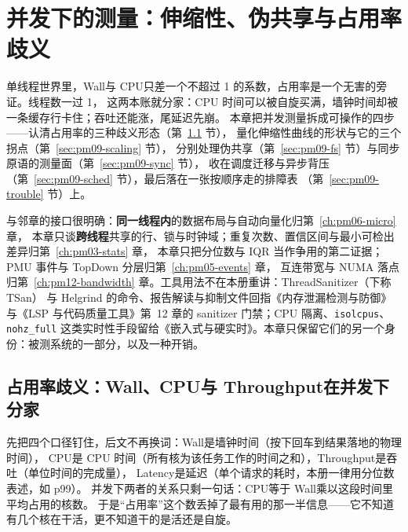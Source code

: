 \documentclass[12pt,a4paper,fontset=fandol]{ctexbook}
\newcommand{\Tp}[1]{\texttt{#1}}
\newcommand{\Lang}[1]{\textsf{#1}}
\newcommand{\MWall}{\Lang{Wall}}
\newcommand{\MCpu}{\Lang{CPU}}
\newcommand{\MLat}{\Lang{Latency}}
\newcommand{\MThr}{\Lang{Throughput}}
\newcommand{\Mx}[1]{\textsf{#1}}
\begin{document}
\chapter{并发下的测量：伸缩性、伪共享与占用率歧义}
\label{ch:pm09-concurrency}

单线程世界里，\MWall 与 \MCpu 只差一个不超过 1 的系数，占用率是一个无害的旁证。线程数一过 1，
这两本账就分家：CPU 时间可以被自旋买满，墙钟时间却被一条缓存行卡住；吞吐还能涨，尾延迟先崩。
本章把并发测量拆成可操作的四步——认清占用率的三种歧义形态（第~\ref{sec:pm09-ambiguity} 节），
量化伸缩性曲线的形状与它的三个拐点（第~\ref{sec:pm09-scaling} 节），
分别处理伪共享（第~\ref{sec:pm09-fs} 节）与同步原语的测量面（第~\ref{sec:pm09-sync} 节），
收在调度迁移与异步背压（第~\ref{sec:pm09-sched} 节），最后落在一张按顺序走的排障表
（第~\ref{sec:pm09-trouble} 节）上。

与邻章的接口很明确：\textbf{同一线程内}的数据布局与自动向量化归第~\ref{ch:pm06-micro} 章，
本章只谈\textbf{跨线程}共享的行、锁与时钟域；重复次数、置信区间与最小可检出差异归第~\ref{ch:pm03-stats} 章，
本章只把分位数与 IQR 当作争用的第二证据；PMU 事件与 TopDown 分层归第~\ref{ch:pm05-events} 章，
互连带宽与 NUMA 落点归第~\ref{ch:pm12-bandwidth} 章。工具用法不在本册重讲：ThreadSanitizer（下称 TSan）
与 Helgrind 的命令、报告解读与抑制文件回指《内存泄漏检测与防御》
与《LSP 与代码质量工具》第~12 章的 sanitizer 门禁；CPU 隔离、\Tp{isolcpus}、\Tp{nohz\_full}
这类实时性手段留给《嵌入式与硬实时》。本章只保留它们的另一个身份：被测系统的一部分，以及一种开销。

\section{占用率歧义：\MWall、\MCpu 与 \MThr 在并发下分家}
\label{sec:pm09-ambiguity}

先把四个口径钉住，后文不再换词：\MWall 是墙钟时间（按下回车到结果落地的物理时间），
\MCpu 是 CPU 时间（所有核为该任务工作的时间之和），\MThr 是吞吐（单位时间的完成量），
\MLat 是延迟（单个请求的耗时，本册一律用分位数表述，如 \Mx{p99}）。
并发下两者的关系只剩一句话：\MCpu 等于 \MWall 乘以这段时间里平均占用的核数。
于是``占用率''这个数丢掉了最有用的那一半信息——它不知道有几个核在干活，更不知道干的是活还是自旋。
\end{document}
